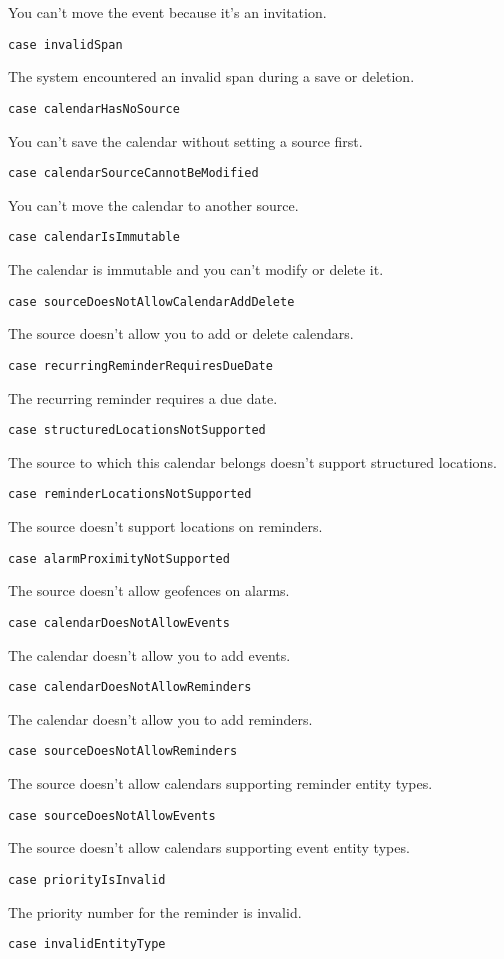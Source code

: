 \documentclass{article}
\begin{document}
You can't move the event because it's an invitation.

\texttt{case invalidSpan}

The system encountered an invalid span during a save or deletion.

\texttt{case calendarHasNoSource}

You can't save the calendar without setting a source first.

\texttt{case calendarSourceCannotBeModified}

You can't move the calendar to another source.

\texttt{case calendarIsImmutable}

The calendar is immutable and you can't modify or delete it.

\texttt{case sourceDoesNotAllowCalendarAddDelete}

The source doesn't allow you to add or delete calendars.

\texttt{case recurringReminderRequiresDueDate}

The recurring reminder requires a due date.

\texttt{case structuredLocationsNotSupported}

The source to which this calendar belongs doesn't support structured locations.

\texttt{case reminderLocationsNotSupported}

The source doesn't support locations on reminders.

\texttt{case alarmProximityNotSupported}

The source doesn't allow geofences on alarms.

\texttt{case calendarDoesNotAllowEvents}

The calendar doesn't allow you to add events.

\texttt{case calendarDoesNotAllowReminders}

The calendar doesn't allow you to add reminders.

\texttt{case sourceDoesNotAllowReminders}

The source doesn't allow calendars supporting reminder entity types.

\texttt{case sourceDoesNotAllowEvents}

The source doesn't allow calendars supporting event entity types.

\texttt{case priorityIsInvalid}

The priority number for the reminder is invalid.

\texttt{case invalidEntityType}
\end{document}
